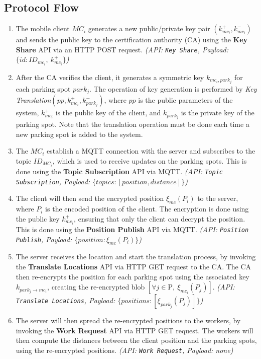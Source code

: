 \subsection{Protocol Flow}
\begin{enumerate}
    \item The mobile client $MC_i$ generates a new public/private key pair $(k_{mc_i}^+, k_{mc_i}^-)$ and sends the public key to the certification authority (CA) using the \textbf{Key Share} API via an HTTP POST request. \emph{(API: \texttt{Key Share}, Payload: $\{id: ID_{mc_i},\ k_{mc_i}^+\}$)}
    \item After the CA verifies the client, it generates a symmetric key $k_{mc_i, park_j}$ for each parking spot $park_j$. The operation of key generation is performed by \emph{Key Translation}$(pp, k_{mc_i}^+, k_{park_j}^-)$, where $pp$ is the public parameters of the system, $k_{mc_i}^+$ is the public key of the client, and $k_{park_j}^-$ is the private key of the parking spot. Note that the translation operation must be done each time a new parking spot is added to the system.
    \item The $MC_i$ establish a MQTT connection with the server and subscribes to the topic $ID_{MC_i}$, which is used to receive updates on the parking spots. This is done using the \textbf{Topic Subscription} API via MQTT. \emph{(API: \texttt{Topic Subscription}, Payload: $\{topics: [position, distance]\}$)}
    \item The client will then send the encrypted position $\xi_{mc}(P_i)$ to the server, where $P_i$ is the encoded position of the client. The encryption is done using the public key $k_{mc_i}^+$, ensuring that only the client can decrypt the position. This is done using the \textbf{Position Publish} API via MQTT. \emph{(API: \texttt{Position Publish}, Payload: $\{position: \xi_{mc}(P_i)\}$)}
    \item The server receives the location and start the translation process, by invoking the \textbf{Translate Locations} API via HTTP GET request to the CA. The CA then re-encrypts the position for each parking spot using the associated key $k_{park_j \to mc_i}$, creating the re-encrypted blob $[\forall j \in \text{P},\ \xi_{mc_i}(P_j)]$. \emph{(API: \texttt{Translate Locations}, Payload: $\{positions: [\xi_{park_j}(P_j)]\}$)}
    \item The server will then spread the re-encrypted positions to the workers, by invoking the \textbf{Work Request} API via HTTP GET request. The workers will then compute the distances between the client position and the parking spots, using the re-encrypted positions. \emph{(API: \texttt{Work Request}, Payload: none)}

\end{enumerate}
